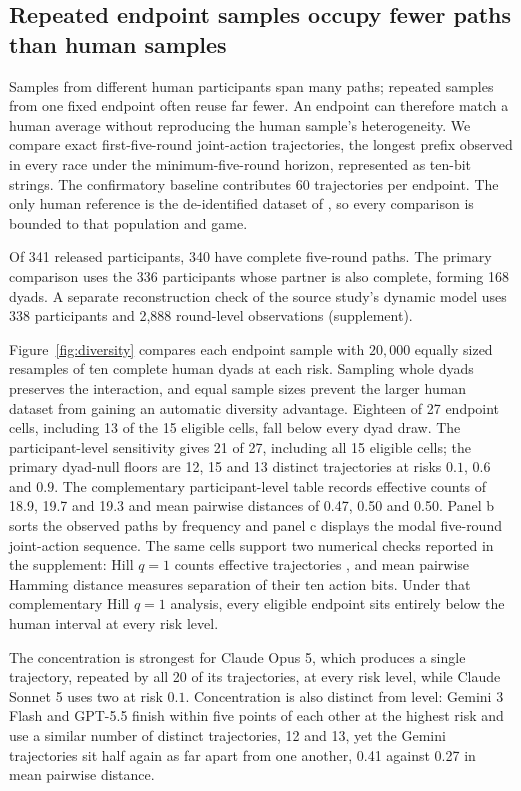 \documentclass[sigconf,anonymous]{aamas}
\begin{document}
\subsection{Repeated endpoint samples occupy fewer paths than human samples}
\label{sec:results-diversity}

Samples from different human participants span many paths; repeated samples from
one fixed endpoint often reuse far fewer. An endpoint can therefore match a human
average without reproducing the human sample's heterogeneity. We compare exact
first-five-round joint-action trajectories, the longest prefix observed in
every race under the minimum-five-round horizon, represented as ten-bit strings. The
confirmatory baseline contributes 60 trajectories per endpoint. The only human
reference is the de-identified dataset of \citet{falling_behind_unsafe}, so every
comparison is bounded to that population and game.

Of 341 released participants, 340 have complete five-round paths. The primary
comparison uses the 336 participants whose partner is also complete, forming 168
dyads. A separate reconstruction check of the source study's dynamic model uses
338 participants and 2{,}888 round-level observations (supplement).

Figure~\ref{fig:diversity} compares each endpoint sample with $20{,}000$ equally
sized resamples of ten complete human dyads at each risk. Sampling whole dyads
preserves the interaction, and equal sample sizes prevent the larger human dataset
from gaining an automatic diversity advantage. Eighteen of 27 endpoint cells,
including 13 of the 15 eligible cells,
fall below every dyad draw. The participant-level sensitivity gives 21 of 27,
including all 15 eligible cells; the primary dyad-null floors are 12, 15 and 13
distinct trajectories at risks $0.1$, $0.6$ and $0.9$. The complementary
participant-level table records effective counts of 18.9, 19.7 and 19.3 and
mean pairwise distances of 0.47, 0.50 and 0.50. Panel b sorts the observed paths
by frequency and panel c displays the modal five-round joint-action sequence.
The same cells support two numerical checks reported in the supplement: Hill
$q{=}1$ counts effective trajectories \citep{hillDiversity1973}, and mean pairwise
Hamming distance measures
separation of their ten action bits. Under that complementary Hill $q{=}1$
analysis, every eligible endpoint sits entirely below the human interval at every
risk level.

The concentration is strongest for Claude Opus 5, which produces a single
trajectory, repeated by all 20 of its trajectories, at every risk level, while
Claude Sonnet 5 uses two at risk $0.1$. Concentration is also distinct from
level: Gemini 3 Flash and GPT-5.5 finish within five points of each other at the
highest risk and use a similar number of distinct trajectories, 12 and 13, yet the
Gemini trajectories sit half again as far apart from one another, 0.41 against 0.27
in mean pairwise distance.
\end{document}
